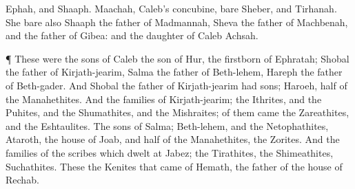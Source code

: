 {Ephah, and
Shaaph.
Maachah,
Caleb’s
concubine,
bare
Sheber, and
Tirhanah.
She
bare also
Shaaph the
father of
Madmannah,
Sheva the
father of
Machbenah, and the
father of
Gibea: and the
daughter of
Caleb
{}
Achsah.
\par }{\PP {}¶ These were the
sons of
Caleb the
son of
Hur, the
firstborn of
Ephratah;
Shobal the
father of
Kirjath-jearim,
Salma the
father of
Beth-lehem,
Hareph the
father of
Beth-gader.
And
Shobal the
father of
Kirjath-jearim had
sons;
Haroeh,
{}
half of the
Manahethites.
And the
families of
Kirjath-jearim; the
Ithrites, and the
Puhites, and the
Shumathites, and the
Mishraites; of them
came the
Zareathites, and the
Eshtaulites.
The
sons of
Salma;
Beth-lehem, and the
Netophathites,
Ataroth, the house of
Joab, and
half of the
Manahethites, the
Zorites.
And the
families of the
scribes which
dwelt at
Jabez; the
Tirathites, the
Shimeathites,
{}
Suchathites.
These
{} the
Kenites that
came of
Hemath, the
father of the
house of
Rechab.

}
